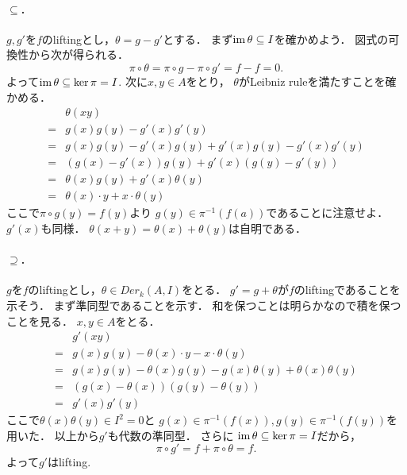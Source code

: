 \documentclass[a4paper]{jsarticle}
\begin{document}
    \paragraph{$\subseteq$.}
    $g, g'$を$f$のliftingとし，$\theta=g-g'$とする．
    まず$\operatorname{im} \theta \subseteq I$を確かめよう．
    図式の可換性から次が得られる．
    \[ \pi \circ \theta=\pi \circ g- \pi \circ g'=f-f=0. \]
    よって$\operatorname{im} \theta \subseteq \ker \pi=I$.
    次に$x, y \in A$をとり，
    $\theta$がLeibniz ruleを満たすことを確かめる．
    \begin{align*}
        {}& \theta(xy) \\
        =&  g(x)g(y)-g'(x)g'(y) \\
        =&  g(x)g(y)-g'(x)g(y)+g'(x)g(y)-g'(x)g'(y) \\
        =&  (g(x)-g'(x)) g(y)+g'(x) (g(y)-g'(y)) \\
        =&  \theta(x) g(y)+g'(x) \theta(y) \\
        =&  \theta(x) \cdot y+x \cdot \theta(y)
    \end{align*}
    ここで$\pi \circ g(y)=f(y)$より
    $g(y) \in \pi^{-1}(f(a))$であることに注意せよ．
    $g'(x)$も同様．
    $\theta(x+y)=\theta(x)+\theta(y)$は自明である．

    \paragraph{$\supseteq$.}
    $g$を$f$のliftingとし，$\theta \in Der_k(A,I)$をとる．
    $g'=g+\theta$が$f$のliftingであることを示そう．
    まず準同型であることを示す．
    和を保つことは明らかなので積を保つことを見る．
    $x, y \in A$をとる．
    \begin{align*}
        {}& g'(xy) \\
        =&  g(x)g(y)-\theta(x) \cdot y-x \cdot \theta(y) \\
        =&  g(x)g(y)-\theta(x) g(y)-g(x) \theta(y)+\theta(x)\theta(y) \\
        =&  (g(x)-\theta(x))(g(y)-\theta(y)) \\
        =&  g'(x)g'(y)
    \end{align*}
    ここで$\theta(x)\theta(y) \in I^2=0$と
    $g(x)\in \pi^{-1}(f(x)), g(y) \in \pi^{-1}(f(y))$を用いた．
    以上から$g'$も代数の準同型．
    さらに
    $\operatorname{im} \theta \subseteq \ker \pi=I$だから，
    \[ \pi \circ g'=f+\pi \circ \theta=f. \]
    よって$g'$はlifting.
\end{document}
